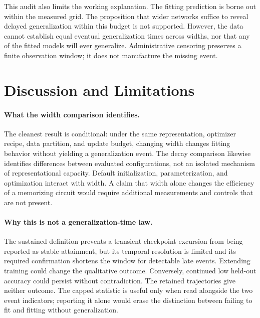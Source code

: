 \documentclass{article}
\begin{document}
This audit also limits the working explanation. The fitting prediction is borne out within the measured grid. The proposition that wider networks suffice to reveal delayed generalization within this budget is not supported. However, the data cannot establish equal eventual generalization times across widths, nor that any of the fitted models will ever generalize. Administrative censoring preserves a finite observation window; it does not manufacture the missing event.

\section{Discussion and Limitations}

\paragraph{What the width comparison identifies.}
The cleanest result is conditional: under the same representation, optimizer recipe, data partition, and update budget, changing width changes fitting behavior without yielding a generalization event. The decay comparison likewise identifies differences between evaluated configurations, not an isolated mechanism of representational capacity. Default initialization, parameterization, and optimization interact with width. A claim that width alone changes the efficiency of a memorizing circuit would require additional measurements and controls that are not present.

\paragraph{Why this is not a generalization-time law.}
The sustained definition prevents a transient checkpoint excursion from being reported as stable attainment, but its temporal resolution is limited and its required confirmation shortens the window for detectable late events. Extending training could change the qualitative outcome. Conversely, continued low held-out accuracy could persist without contradiction. The retained trajectories give neither outcome. The capped statistic is useful only when read alongside the two event indicators; reporting it alone would erase the distinction between failing to fit and fitting without generalization.
\end{document}
